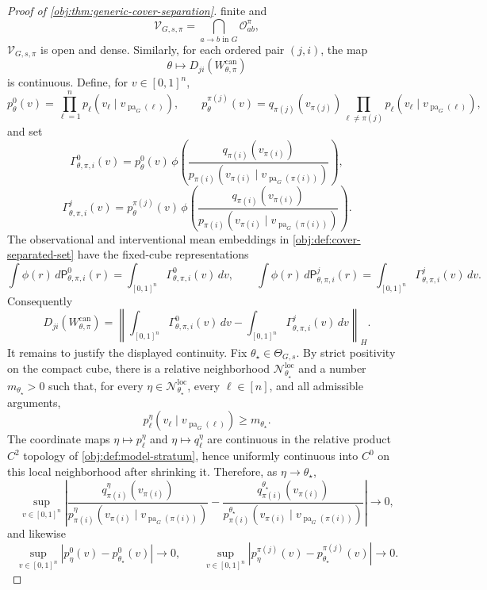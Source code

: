 \documentclass[11pt]{article}
\begin{document}
\begin{proof}[Proof of \cref{obj:thm:generic-cover-separation}]
finite and
\[
\mathcal V_{G,s,\pi}
=
\bigcap_{a\to b\text{ in }G}\mathcal O^\pi_{ab},
\]
\(\mathcal V_{G,s,\pi}\) is open and dense.  Similarly, for each ordered pair \((j,i)\), the map
\[
\theta\longmapsto
D_{ji}\!\left(W_{\theta,\pi}^{\mathrm{can}}\right)
\]
is continuous.  Define, for \(v\in[0,1]^n\),
\[
p^0_\theta(v)=
\prod_{\ell=1}^n
p_\ell(v_\ell\mid v_{\operatorname{pa}_G(\ell)}),
\qquad
p^{\pi(j)}_\theta(v)=
q_{\pi(j)}(v_{\pi(j)})
\prod_{\ell\ne \pi(j)}
p_\ell(v_\ell\mid v_{\operatorname{pa}_G(\ell)}),
\]
and set
\[
\Gamma^0_{\theta,\pi,i}(v)
=
p^0_\theta(v)\,
\phi\!\left(
\frac{q_{\pi(i)}(v_{\pi(i)})}
     {p_{\pi(i)}(v_{\pi(i)}\mid v_{\operatorname{pa}_G(\pi(i))})}
\right),
\]
\[
\Gamma^j_{\theta,\pi,i}(v)
=
p^{\pi(j)}_\theta(v)\,
\phi\!\left(
\frac{q_{\pi(i)}(v_{\pi(i)})}
     {p_{\pi(i)}(v_{\pi(i)}\mid v_{\operatorname{pa}_G(\pi(i))})}
\right).
\]
The observational and interventional mean embeddings in
\cref{obj:def:cover-separated-set} have the fixed-cube representations
\[
\int \phi(r)\,d\mathsf P^0_{\theta,\pi,i}(r)
=
\int_{[0,1]^n}\Gamma^0_{\theta,\pi,i}(v)\,dv,
\qquad
\int \phi(r)\,d\mathsf P^j_{\theta,\pi,i}(r)
=
\int_{[0,1]^n}\Gamma^j_{\theta,\pi,i}(v)\,dv.
\]
Consequently
\[
D_{ji}\!\left(W_{\theta,\pi}^{\mathrm{can}}\right)
=
\left\|
\int_{[0,1]^n}\Gamma^0_{\theta,\pi,i}(v)\,dv
-
\int_{[0,1]^n}\Gamma^j_{\theta,\pi,i}(v)\,dv
\right\|_H .
\]
It remains to justify the displayed continuity.  Fix
\(\theta_\star\in\Theta_{G,s}\).  By strict positivity on the compact cube,
there is a relative neighborhood \(\mathcal N_{\theta_\star}^{\mathrm{loc}}\)
and a number \(m_{\theta_\star}>0\) such that, for every
\(\eta\in\mathcal N_{\theta_\star}^{\mathrm{loc}}\), every \(\ell\in[n]\), and
all admissible arguments,
\[
p_\ell^\eta(v_\ell\mid v_{\operatorname{pa}_G(\ell)})
\ge m_{\theta_\star}.
\]
The coordinate maps \(\eta\mapsto p_\ell^\eta\) and
\(\eta\mapsto q_\ell^\eta\) are continuous in the relative product \(C^2\)
topology of \cref{obj:def:model-stratum}, hence uniformly continuous into
\(C^0\) on this local neighborhood after shrinking it.  Therefore, as
\(\eta\to\theta_\star\),
\[
\sup_{v\in[0,1]^n}
\left|
\frac{q_{\pi(i)}^\eta(v_{\pi(i)})}
     {p_{\pi(i)}^\eta(v_{\pi(i)}\mid v_{\operatorname{pa}_G(\pi(i))})}
-
\frac{q_{\pi(i)}^{\theta_\star}(v_{\pi(i)})}
     {p_{\pi(i)}^{\theta_\star}(v_{\pi(i)}\mid v_{\operatorname{pa}_G(\pi(i))})}
\right|
\longrightarrow0,
\]
and likewise
\[
\sup_{v\in[0,1]^n}|p^0_\eta(v)-p^0_{\theta_\star}(v)|\longrightarrow0,
\qquad
\sup_{v\in[0,1]^n}|p^{\pi(j)}_\eta(v)-p^{\pi(j)}_{\theta_\star}(v)|
\longrightarrow0.
\]
\end{proof}
\end{document}
